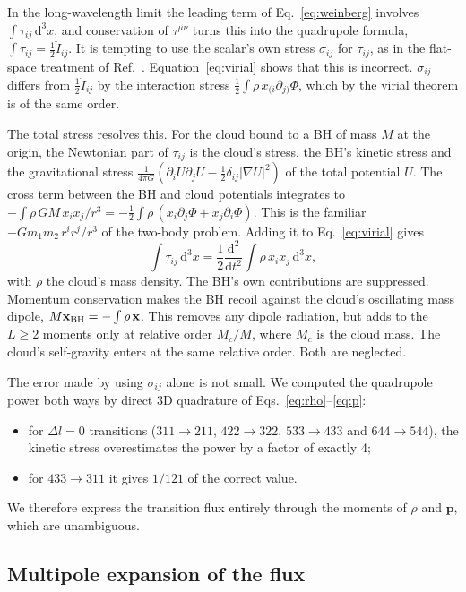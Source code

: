 \documentclass[11pt]{article}
\newcommand{\dd}{\mathrm{d}}
\newcommand{\bx}{\mathbf x}
\newcommand{\bp}{\mathbf p}
\begin{document}
In the long-wavelength limit the leading term of Eq.~\eqref{eq:weinberg} involves $\int\tau_{ij}\,\dd^3x$, and conservation of $\tau^{\mu\nu}$ turns this into the quadrupole formula, $\int\tau_{ij}=\tfrac12\ddot I_{ij}$. It is tempting to use the scalar's own stress $\sigma_{ij}$ for $\tau_{ij}$, as in the flat-space treatment of Ref.~\cite{AD11}. Equation~\eqref{eq:virial} shows that this is incorrect. $\sigma_{ij}$ differs from $\tfrac12\ddot I_{ij}$ by the interaction stress $\tfrac12\int\rho\,x_{(i}\partial_{j)}\Phi$, which by the virial theorem is of the same order.

The total stress resolves this. For the cloud bound to a BH of mass $M$ at the origin, the Newtonian part of $\tau_{ij}$ is the cloud's stress, the BH's kinetic stress and the gravitational stress $\frac1{4\pi G}(\partial_iU\partial_jU-\tfrac12\delta_{ij}|\nabla U|^2)$ of the total potential $U$. The cross term between the BH and cloud potentials integrates to $-\int\rho\,GM\,x_ix_j/r^3=-\tfrac12\int\rho\,(x_i\partial_j\Phi+x_j\partial_i\Phi)$. This is the familiar $-Gm_1m_2\,r^ir^j/r^3$ of the two-body problem. Adding it to Eq.~\eqref{eq:virial} gives
\begin{equation}
\int\tau_{ij}\,\dd^3x=\frac12\frac{\dd^2}{\dd t^2}\int\rho\,x_ix_j\,\dd^3x ,
\end{equation}
with $\rho$ the cloud's mass density. The BH's own contributions are suppressed. Momentum conservation makes the BH recoil against the cloud's oscillating mass dipole, $M\bx_{\rm BH}=-\int\rho\,\bx$. This removes any dipole radiation, but adds to the $L\ge2$ moments only at relative order $M_c/M$, where $M_c$ is the cloud mass. The cloud's self-gravity enters at the same relative order. Both are neglected.

The error made by using $\sigma_{ij}$ alone is not small. We computed the quadrupole power both ways by direct 3D quadrature of Eqs.~\eqref{eq:rho}--\eqref{eq:p}:
\begin{itemize}
\item for $\Delta l=0$ transitions ($311\to211$, $422\to322$, $533\to433$ and $644\to544$), the kinetic stress overestimates the power by a factor of exactly 4;
\item for $433\to311$ it gives $1/121$ of the correct value.
\end{itemize}
We therefore express the transition flux entirely through the moments of $\rho$ and $\bp$, which are unambiguous.

\subsection{Multipole expansion of the flux}
\end{document}
